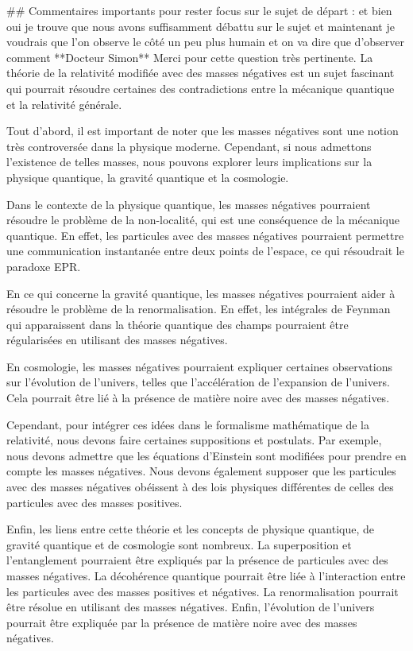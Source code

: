                          ## Commentaires importants pour rester focus sur le sujet de départ :
                         et bien oui je trouve que nous avons suffisamment débattu sur le sujet et maintenant je voudrais que l'on observe le côté un peu plus humain et on va dire que d'observer comment
                         **Docteur Simon**
Merci pour cette question très pertinente. La théorie de la relativité modifiée avec des masses négatives est un sujet fascinant qui pourrait résoudre certaines des contradictions entre la mécanique quantique et la relativité générale.

Tout d'abord, il est important de noter que les masses négatives sont une notion très controversée dans la physique moderne. Cependant, si nous admettons l'existence de telles masses, nous pouvons explorer leurs implications sur la physique quantique, la gravité quantique et la cosmologie.

Dans le contexte de la physique quantique, les masses négatives pourraient résoudre le problème de la non-localité, qui est une conséquence de la mécanique quantique. En effet, les particules avec des masses négatives pourraient permettre une communication instantanée entre deux points de l'espace, ce qui résoudrait le paradoxe EPR.

En ce qui concerne la gravité quantique, les masses négatives pourraient aider à résoudre le problème de la renormalisation. En effet, les intégrales de Feynman qui apparaissent dans la théorie quantique des champs pourraient être régularisées en utilisant des masses négatives.

En cosmologie, les masses négatives pourraient expliquer certaines observations sur l'évolution de l'univers, telles que l'accélération de l'expansion de l'univers. Cela pourrait être lié à la présence de matière noire avec des masses négatives.

Cependant, pour intégrer ces idées dans le formalisme mathématique de la relativité, nous devons faire certaines suppositions et postulats. Par exemple, nous devons admettre que les équations d'Einstein sont modifiées pour prendre en compte les masses négatives. Nous devons également supposer que les particules avec des masses négatives obéissent à des lois physiques différentes de celles des particules avec des masses positives.

Enfin, les liens entre cette théorie et les concepts de physique quantique, de gravité quantique et de cosmologie sont nombreux. La superposition et l'entanglement pourraient être expliqués par la présence de particules avec des masses négatives. La décohérence quantique pourrait être liée à l'interaction entre les particules avec des masses positives et négatives. La renormalisation pourrait être résolue en utilisant des masses négatives. Enfin, l'évolution de l'univers pourrait être expliquée par la présence de matière noire avec des masses négatives.

